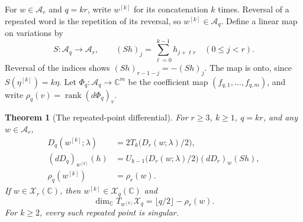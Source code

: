 \documentclass[11pt,a4paper]{article}
\newtheorem{theorem}{Theorem}
\theoremstyle{definition}
\theoremstyle{remark}
\newcommand{\C}{\mathbb C}
\newcommand{\A}{\mathcal A}
\newcommand{\X}{\mathcal X}
\newcommand{\rank}{\operatorname{rank}}
\begin{document}
For $w\in\A_r$ and $q=kr$, write $w^{[k]}$ for its concatenation $k$ times.
Reversal of a repeated word is the repetition of its reversal, so
$w^{[k]}\in\A_q$. Define a linear map on variations by
\begin{equation}\label{eq:S}
 S:\A_q\longrightarrow\A_r,\qquad
 (Sh)_j=\sum_{\ell=0}^{k-1}h_{j+\ell r}\quad(0\leq j<r).
\end{equation}
Reversal of the indices shows $(Sh)_{r-1-j}=-(Sh)_j$.
The map is onto, since $S(\eta^{[k]})=k\eta$.
Let $\Phi_q:\A_q\to\C^m$ be the coefficient map
$(f_{q,1},\ldots,f_{q,m})$, and write
$\rho_q(v)=\rank(d\Phi_q)_v$.

\begin{theorem}[The repeated-point differential]\label{thm:rank}
For $r\geq3$, $k\geq1$, $q=kr$, and any $w\in\A_r$,
\begin{align}
 D_q(w^{[k]};\lambda)&=2T_k\bigl(D_r(w;\lambda)/2\bigr),\label{eq:inflate}\\
 (dD_q)_{w^{[k]}}(h)&=
 U_{k-1}\bigl(D_r(w;\lambda)/2\bigr)(dD_r)_w(Sh),\label{eq:derivative}\\
 \rho_q(w^{[k]})&=\rho_r(w).\label{eq:rankEquality}
\end{align}
If $w\in\X_r(\C)$, then $w^{[k]}\in\X_q(\C)$ and
\begin{equation}\label{eq:tangent}
 \dim_\C T_{w^{[k]}}\X_q=\lfloor q/2\rfloor-\rho_r(w).
\end{equation}
For $k\geq2$, every such repeated point is singular.
\end{theorem}
\end{document}
